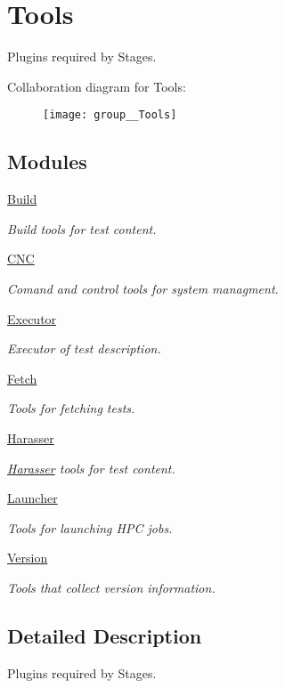 \hypertarget{group__Tools}{\section{Tools}
\label{group__Tools}
}


Plugins required by Stages.  


Collaboration diagram for Tools\-:\nopagebreak
\begin{figure}[H]
\begin{center}
\leavevmode
\texttt{[image: group\_\_Tools]}
\end{center}
\end{figure}
\subsection*{Modules}
\begin{DoxyCompactItemize}
\item 
\hyperlink{group__Build}{Build}
\begin{DoxyCompactList}\small\item\em Build tools for test content. \end{DoxyCompactList}\item 
\hyperlink{group__CNC}{C\-N\-C}
\begin{DoxyCompactList}\small\item\em Comand and control tools for system managment. \end{DoxyCompactList}\item 
\hyperlink{group__Executor}{Executor}
\begin{DoxyCompactList}\small\item\em Executor of test description. \end{DoxyCompactList}\item 
\hyperlink{group__Fetch}{Fetch}
\begin{DoxyCompactList}\small\item\em Tools for fetching tests. \end{DoxyCompactList}\item 
\hyperlink{group__Harasser}{Harasser}
\begin{DoxyCompactList}\small\item\em \hyperlink{namespaceHarasser}{Harasser} tools for test content. \end{DoxyCompactList}\item 
\hyperlink{group__Launcher}{Launcher}
\begin{DoxyCompactList}\small\item\em Tools for launching H\-P\-C jobs. \end{DoxyCompactList}\item 
\hyperlink{group__Version}{Version}
\begin{DoxyCompactList}\small\item\em Tools that collect version information. \end{DoxyCompactList}\end{DoxyCompactItemize}


\subsection{Detailed Description}
Plugins required by Stages. 